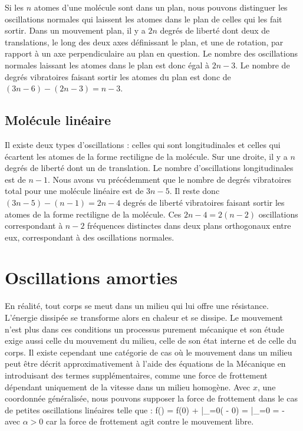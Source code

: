 Si les $n$ atomes d'une mol\'ecule sont dans un plan, nous pouvons distinguer les oscillations normales qui laissent les atomes dans le plan de celles qui les fait sortir. Dans un mouvement plan, il y a $2n$ degr\'es de libert\'e dont deux de translations, le long des deux axes d\'efinissant le plan, et une de rotation, par rapport \`a un axe perpendiculaire au plan en question. Le nombre des oscillations normales laissant les atomes dans le plan est donc \'egal \`a $2n - 3$. Le nombre de degr\'es vibratoires faisant sortir les atomes du plan est donc de $(3n - 6) - (2n - 3) = n - 3$.

\subsection{Mol\'ecule lin\'eaire}

Il existe deux types d'oscillations : celles qui sont longitudinales et celles qui \'ecartent les atomes de la forme rectiligne de la mol\'ecule. Sur une droite, il y a $n$ degr\'es de libert\'e dont un de translation. Le nombre d'oscillations longitudinales est de $n - 1$. Nous avons vu pr\'ec\'edemment que le nombre de degr\'es vibratoires total pour une mol\'ecule lin\'eaire est de $3n - 5$. Il reste donc $(3n - 5) - (n - 1) = 2n - 4$ degr\'es de libert\'e vibratoires faisant sortir les atomes de la forme rectiligne de la mol\'ecule. Ces $2n - 4 = 2(n - 2)$ oscillations correspondant \`a $n - 2$ fr\'equences distinctes dans deux plans orthogonaux entre eux, correspondant \`a des oscillations normales.

\section{Oscillations amorties}\label{PAR:25}

En r\'{e}alit\'{e}, tout corps se meut dans un milieu qui lui offre une r\'{e}sistance. L'\'{e}nergie dissip\'{e}e se transforme alors en chaleur et se dissipe. Le mouvement n'est plus dans ces conditions un processus purement m\'{e}canique et son \'{e}tude exige aussi celle du mouvement du milieu, celle de son \'{e}tat interne et de celle du corps. Il existe cependant une cat\'{e}gorie de cas o\`{u} le mouvement dans un milieu peut \^{e}tre d\'{e}crit approximativement \`{a} l'aide des \'{e}quations de la M\'{e}canique en introduisant des termes suppl\'{e}mentaires, comme une force de frottement d\'{e}pendant uniquement de la vitesse dans un milieu homog\`{e}ne. Avec $x$, une coordonn\'{e}e g\'{e}n\'{e}ralis\'{e}e, nous pouvons supposer la force de frottement dans le cas de petites oscillations lin\'{e}aires telle que :
\benn
	f() = f(0) + \bigg|_{=0}( - 0) = \bigg|_{=0} = -\alpha{}
\eenn
avec $\alpha > 0$ car la force de frottement agit contre le mouvement libre.

